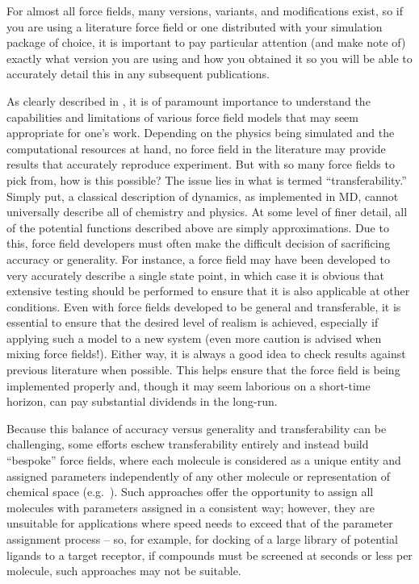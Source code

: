 \documentclass[9pt,bestpractices]{livecoms}
\begin{document}
For almost all force fields, many versions, variants, and modifications exist, so if you are using a literature force field or one distributed with your simulation package of choice, it is important to pay particular attention (and make note of) exactly what version you are using and how you obtained it so you will be able to accurately detail this in any subsequent publications.

As clearly described in \citet{Becker2013}, it is of paramount importance to understand the capabilities and limitations of various force field models that may seem appropriate for one's work.
Depending on the physics being simulated and the computational resources at hand, no force field in the literature may provide results that accurately reproduce experiment.
But with so many force fields to pick from, how is this possible?
The issue lies in what is termed ``transferability.''
Simply put, a classical description of dynamics, as implemented in MD, cannot universally describe all of chemistry and physics.
At some level of finer detail, all of the potential functions described above are simply approximations.
Due to this, force field developers must often make the difficult decision of sacrificing accuracy or generality.
For instance, a force field may have been developed to very accurately describe a single state point, in which case it is obvious that extensive testing should be performed to ensure that it is also applicable at other conditions.
Even with force fields developed to be general and transferable, it is essential to ensure that the desired level of realism is achieved, especially if applying such a model to a new system (even more caution is advised when mixing force fields!).
Either way, it is always a good idea to check results against previous literature when possible.
This helps ensure that the force field is being implemented properly and, though it may seem laborious on a short-time horizon, can pay substantial dividends in the long-run.

Because this balance of accuracy versus generality and transferability can be challenging, some efforts eschew transferability entirely and instead build ``bespoke'' force fields, where each molecule is considered as a unique entity and assigned parameters independently of any other molecule or representation of chemical space (e.g.~\cite{Dupradeau:2010:PhysChemChemPhys}).
Such approaches offer the opportunity to assign all molecules with parameters assigned in a consistent way; however, they are unsuitable for applications where speed needs to exceed that of the parameter assignment process -- so, for example, for docking of a large library of potential ligands to a target receptor, if compounds must be screened at seconds or less per molecule, such approaches may not be suitable.
\end{document}
